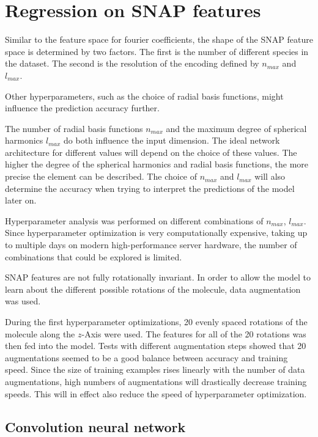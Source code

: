 \section{Regression on SNAP features}
\label{sec:Evaluation:snap}

Similar to the feature space for fourier coefficients, the shape of the SNAP feature space is determined by two factors.
The first is the number of different species in the dataset.
The second is the resolution of the encoding defined by $n_{max}$ and $l_{max}$.

Other hyperparameters, such as the choice of radial basis functions, might influence the prediction accuracy further.

The number of radial basis functions $n_{max}$ and the maximum degree of spherical harmonics $l_{max}$ do both influence
the input dimension.
The ideal network architecture for different values will depend on the choice of these values.
The higher the degree of the spherical harmonics and radial basis functions, the more precise the element can be described. %
The choice of $n_{max}$ and $l_{max}$ will also determine the accuracy when trying to interpret the predictions of the model later on.

Hyperparameter analysis was performed on different combinations of $n_{max}$, $l_{max}$.
Since hyperparameter optimization is very computationally expensive, taking up to multiple days on modern high-performance 
server hardware, the number of combinations that could be explored is limited.

SNAP features are not fully rotationally invariant.
In order to allow the model to learn about the different possible rotations of the molecule, data augmentation was used.

During the first hyperparameter optimizations, 20 evenly spaced rotations of the molecule along the $z$-Axis were used.
The features for all of the 20 rotations was then fed into the model.
Tests with different augmentation steps showed that 20 augmentations seemed to be a good balance between 
accuracy and training speed.
Since the size of training examples rises linearly with the number of data augmentations,
high numbers of augmentations will drastically decrease training speeds.
This will in effect also reduce the speed of hyperparameter optimization.

\subsection{Convolution neural network}


